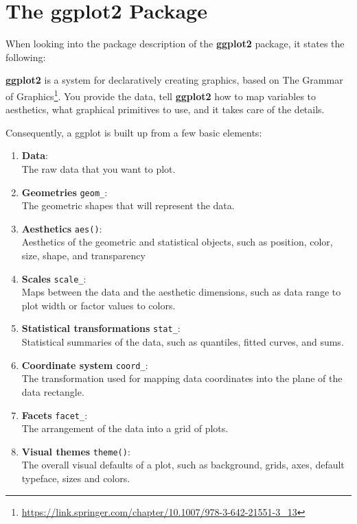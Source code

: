 \documentclass[
]{krantz}
\providecommand{\tightlist}{%
  \setlength{\itemsep}{0pt}\setlength{\parskip}{0pt}}
\renewenvironment{quote}{\begin{VF}}{\end{VF}}
\renewcommand{\href}[2]{#2\footnote{\url{#1}}}
\begin{document}
\hypertarget{ggplot}{%
\section{\texorpdfstring{The \textbf{ggplot2} Package}{The ggplot2 Package}}\label{ggplot}}

When looking into the package description of the \textbf{ggplot2} package, it states the following:

\begin{quote}
\textbf{ggplot2} is a system for declaratively creating graphics, based on \href{https://link.springer.com/chapter/10.1007/978-3-642-21551-3_13}{The Grammar of Graphics}. You provide the data, tell \textbf{ggplot2} how to map variables to aesthetics, what graphical primitives to use, and it takes care of the details.
\end{quote}

Consequently, a ggplot is built up from a few basic elements:

\begin{enumerate}
\def\labelenumi{\arabic{enumi}.}
\tightlist
\item
  \textbf{Data}:\\
  The raw data that you want to plot.
\item
  \textbf{Geometries} \texttt{geom\_}:\\
  The geometric shapes that will represent the data.
\item
  \textbf{Aesthetics} \texttt{aes()}:\\
  Aesthetics of the geometric and statistical objects, such as position, color, size, shape, and transparency
\item
  \textbf{Scales} \texttt{scale\_}:\\
  Maps between the data and the aesthetic dimensions, such as data range to plot width or factor values to colors.
\item
  \textbf{Statistical transformations} \texttt{stat\_}:\\
  Statistical summaries of the data, such as quantiles, fitted curves, and sums.
\item
  \textbf{Coordinate system} \texttt{coord\_}:\\
  The transformation used for mapping data coordinates into the plane of the data rectangle.
\item
  \textbf{Facets} \texttt{facet\_}:\\
  The arrangement of the data into a grid of plots.
\item
  \textbf{Visual themes} \texttt{theme()}:\\
  The overall visual defaults of a plot, such as background, grids, axes, default typeface, sizes and colors.
\end{enumerate}
\end{document}
